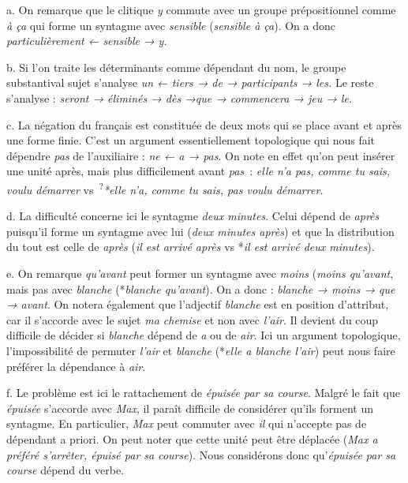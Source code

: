 {     a. On remarque que le clitique \textit{y} commute avec un groupe prépositionnel comme \textit{à ça} qui forme un syntagme avec \textit{sensible} (\textit{sensible à ça}). On a donc \textit{particulièrement ← sensible → y.}

    b. Si l’on traite les déterminants comme dépendant du nom, le groupe substantival sujet s’analyse \textit{un ← tiers → de → participants → les.} Le reste s’analyse : \textit{seront → éliminés → dès →que → commencera → jeu → le.}

    c. La négation du français est constituée de deux mots qui se place avant et après une forme finie. C’est un argument essentiellement topologique qui nous fait dépendre \textit{pas} de l’auxiliaire : \textit{ne ← a → pas}. On note en effet qu’on peut insérer une unité après, mais plus difficilement avant \textit{pas~}: \textit{elle n’a pas, comme tu sais, voulu démarrer} vs~\textsuperscript{?}\textit{*elle n’a, comme tu sais, pas voulu démarrer.}

    d. La difficulté concerne ici le syntagme \textit{deux minutes}. Celui dépend de \textit{après} puisqu’il forme un syntagme avec lui (\textit{deux minutes après}) et que la distribution du tout est celle de \textit{après} (\textit{il est arrivé après} vs *\textit{il est arrivé deux minutes}).

    e. On remarque \textit{qu’avant} peut former un syntagme avec \textit{moins} (\textit{moins qu’avant}, mais pas avec \textit{blanche} (*\textit{blanche qu’avant}). On a donc : \textit{blanche → moins → que → avant}. On notera également que l’adjectif \textit{blanche} est en position d’attribut, car il s’accorde avec le sujet \textit{ma chemise} et non avec \textit{l’air}. Il devient du coup difficile de décider si \textit{blanche} dépend de \textit{a} ou de \textit{air}. Ici un argument topologique, l’impossibilité de permuter \textit{l’air} et \textit{blanche} (*\textit{elle a blanche l’air}) peut nous faire préférer la dépendance à \textit{air}.

    f. Le problème est ici le rattachement de \textit{épuisée par sa course}. Malgré le fait que \textit{épuisée} s’accorde avec \textit{Max}, il paraît difficile de considérer qu’ils forment un syntagme. En particulier, \textit{Max} peut commuter avec \textit{il} qui n’accepte pas de dépendant a priori. On peut noter que cette unité peut être déplacée (\textit{Max a préféré s’arrêter, épuisé par sa course}). Nous considérons donc qu’\textit{épuisée par sa course} dépend du verbe.

}
